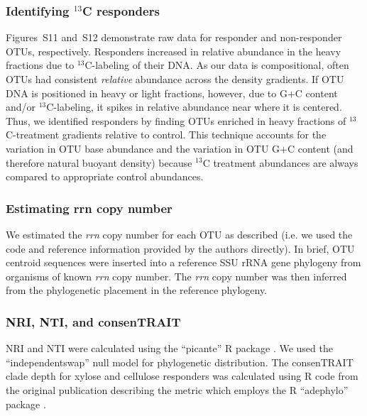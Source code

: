 \documentclass{article}
\begin{document}
\subsubsection{Identifying $^{13}$C responders} 
Figures~S11 and~S12 demonstrate raw data for responder and non-responder OTUs,
respectively. Responders increased in relative abundance in the heavy fractions
due to $^{13}$C-labeling of their DNA. As our data is compositional, often OTUs
had consistent \textit{relative} abundance across the density gradients. If OTU
DNA is positioned in heavy or light fractions, however, due to G$+$C content
and/or $^{13}$C-labeling, it spikes in relative abundance near where it is
centered. Thus, we identified responders by finding OTUs enriched in heavy
fractions of $^{13}$C-treatment gradients relative to control. This technique
accounts for the variation in OTU base abundance and the variation in OTU G$+$C
content (and therefore natural buoyant density) because $^{13}$C treatment
abundances are always compared to appropriate control abundances.  

\subsubsection{Estimating rrn copy number}
We estimated the \textit{rrn} copy number for each OTU as described
\citep{Kembel_2012} (i.e. we used the code and reference information provided
by the authors \citep{Kembel_2012} directly). In brief, OTU centroid sequences
were inserted into a reference SSU rRNA gene phylogeny \citep{matsen2010} from
organisms of known \textit{rrn} copy number. The \textit{rrn} copy number was
then inferred from the phylogenetic placement in the reference phylogeny. 

\subsubsection{NRI, NTI, and consenTRAIT}
NRI and NTI were calculated using the ``picante'' R package
\citep{kembel2010}. We used the ``independentswap'' null model for
phylogenetic distribution. The consenTRAIT clade depth for xylose and cellulose
responders was calculated using R code from the original publication describing
the metric \citep{Martiny2013} which employs the R ``adephylo'' package
\citep{jombart2010}.
\end{document}
